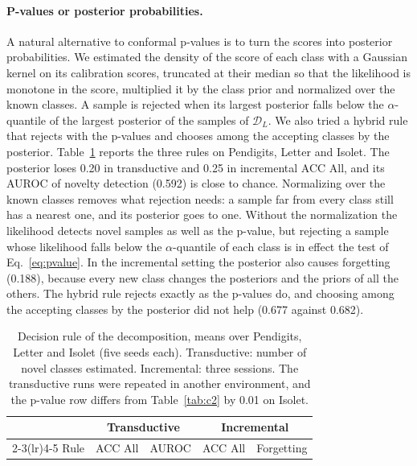 \documentclass[pdflatex,sn-basic]{sn-jnl}
\newcommand{\DL}{\mathcal{D}_L}
\begin{document}
\paragraph{P-values or posterior probabilities.} A natural alternative to conformal p-values is to turn the scores into posterior probabilities. We estimated the density of the score of each class with a Gaussian kernel on its calibration scores, truncated at their median so that the likelihood is monotone in the score, multiplied it by the class prior and normalized over the known classes. A sample is rejected when its largest posterior falls below the $\alpha$-quantile of the largest posterior of the samples of $\DL$. We also tried a hybrid rule that rejects with the p-values and chooses among the accepting classes by the posterior. Table~\ref{tab:decision} reports the three rules on Pendigits, Letter and Isolet. The posterior loses 0.20 in transductive and 0.25 in incremental ACC All, and its AUROC of novelty detection (0.592) is close to chance. Normalizing over the known classes removes what rejection needs: a sample far from every class still has a nearest one, and its posterior goes to one. Without the normalization the likelihood detects novel samples as well as the p-value, but rejecting a sample whose likelihood falls below the $\alpha$-quantile of each class is in effect the test of Eq.~\eqref{eq:pvalue}. In the incremental setting the posterior also causes forgetting (0.188), because every new class changes the posteriors and the priors of all the others. The hybrid rule rejects exactly as the p-values do, and choosing among the accepting classes by the posterior did not help (0.677 against 0.682).

\begin{table}[t]
\caption{Decision rule of the decomposition, means over Pendigits, Letter and Isolet (five seeds each). Transductive: number of novel classes estimated. Incremental: three sessions. The transductive runs were repeated in another environment, and the p-value row differs from Table~\ref{tab:c2} by 0.01 on Isolet.}\label{tab:decision}
\centering\footnotesize
\begin{tabular}{@{}lrrrr@{}}
\toprule
 & \multicolumn{2}{c}{Transductive} & \multicolumn{2}{c}{Incremental} \\
\cmidrule(lr){2-3}\cmidrule(lr){4-5}
Rule & ACC All & AUROC & ACC All & Forgetting \\
\midrule

\end{tabular}
\end{table}
\end{document}
